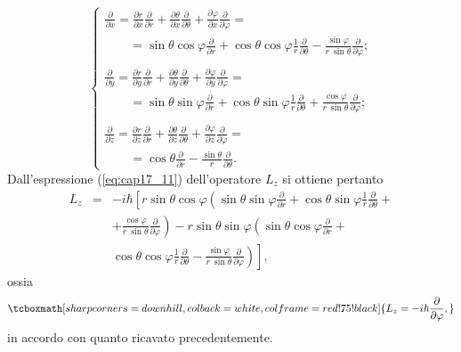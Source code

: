 \documentclass[a4paper,12pt,oneside]{book}
\begin{document}
\begin{equation}
\begin{cases}
\displaystyle{\frac{\partial}{\partial x} = \frac{\partial r}{\partial x}\frac{\partial}{\partial r}+\frac{\partial \theta}{\partial x}\frac{\partial}{\partial \theta}+ \frac{\partial \varphi}{\partial x}\frac{\partial}{\partial \varphi} = }\\
\qquad = \displaystyle{\sin\theta \cos \varphi \frac{\partial}{\partial r}+\cos\theta \cos \varphi\frac{1}{r} \frac{\partial}{\partial \theta}-\frac{\sin \varphi}{r\ \sin \theta} \frac{\partial}{\partial \varphi}}; \\
\\
\displaystyle{\frac{\partial}{\partial y} = \frac{\partial r}{\partial y}\frac{\partial}{\partial r}+\frac{\partial \theta}{\partial y}\frac{\partial}{\partial \theta}+ \frac{\partial \varphi}{\partial y}\frac{\partial}{\partial \varphi} = }\\
\qquad = \displaystyle{\sin\theta \sin \varphi \frac{\partial}{\partial r}+\cos\theta \sin \varphi\frac{1}{r} \frac{\partial}{\partial \theta}+\frac{\cos \varphi}{r\ \sin \theta} \frac{\partial}{\partial \varphi}}; \\
\\
\displaystyle{\frac{\partial}{\partial z} = \frac{\partial r}{\partial z}\frac{\partial}{\partial r}+\frac{\partial \theta}{\partial z}\frac{\partial}{\partial \theta}+ \frac{\partial \varphi}{\partial z}\frac{\partial}{\partial \varphi} = }\\
\qquad = \displaystyle{\cos\theta\frac{\partial}{\partial r}-\frac{\sin \theta}{r} \frac{\partial}{\partial \theta}}.
\end{cases}
\end{equation}
Dall'espressione (\ref{eq:cap17_11}) dell'operatore $L_z$ si ottiene pertanto
\begin{eqnarray}
L_z &=&-i\hbar \left[ r\sin \theta \cos \varphi \left(\sin \theta \sin \varphi \frac{\partial}{\partial r}+\cos \theta \sin \varphi\frac{1}{r} \frac{\partial}{\partial \theta}+ \right.\right. \nonumber \\
& &\left. + \frac{\cos \varphi}{r\ \sin \theta} \frac{\partial}{\partial \varphi}\right) - r \sin \theta \sin \varphi \left( \sin \theta \cos \varphi \frac{\partial}{\partial r}+\right. \nonumber \\
& & \left. \left. \cos \theta \cos \varphi\frac{1}{r} \frac{\partial}{\partial \theta}-\frac{\sin \varphi}{r\ \sin \theta} \frac{\partial}{\partial \varphi}\right)\right] ,
\end{eqnarray}
ossia
	\begin{equation}
		\tcboxmath[sharp corners=downhill, colback=white, colframe=red!75!black]{
		L_z = -i\hbar \frac{\partial}{\partial \varphi},
		}
	\end{equation}
in accordo con quanto ricavato precedentemente.\\
\end{document}

